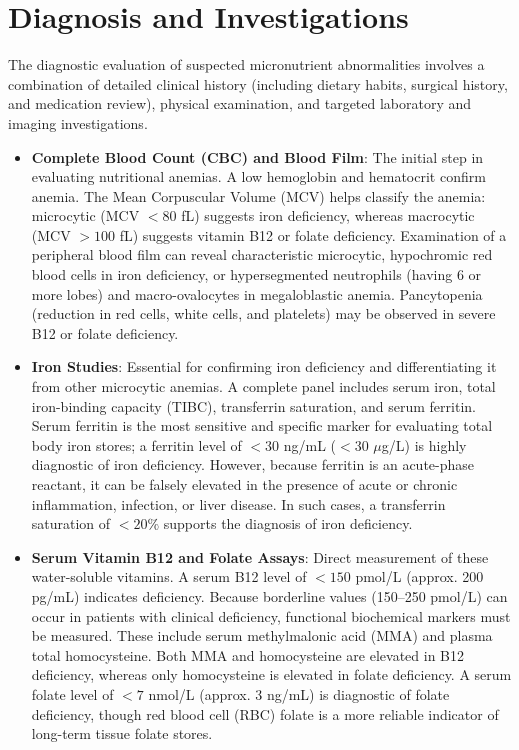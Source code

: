 \section*{Diagnosis and Investigations}
The diagnostic evaluation of suspected micronutrient abnormalities involves a combination of detailed clinical history (including dietary habits, surgical history, and medication review), physical examination, and targeted laboratory and imaging investigations.
\begin{itemize}
\item \textbf{Complete Blood Count (CBC) and Blood Film}: The initial step in evaluating nutritional anemias. A low hemoglobin and hematocrit confirm anemia. The Mean Corpuscular Volume (MCV) helps classify the anemia: microcytic (MCV $< 80$ fL) suggests iron deficiency, whereas macrocytic (MCV $> 100$ fL) suggests vitamin B12 or folate deficiency. Examination of a peripheral blood film can reveal characteristic microcytic, hypochromic red blood cells in iron deficiency, or hypersegmented neutrophils (having 6 or more lobes) and macro-ovalocytes in megaloblastic anemia. Pancytopenia (reduction in red cells, white cells, and platelets) may be observed in severe B12 or folate deficiency.
\item \textbf{Iron Studies}: Essential for confirming iron deficiency and differentiating it from other microcytic anemias. A complete panel includes serum iron, total iron-binding capacity (TIBC), transferrin saturation, and serum ferritin. Serum ferritin is the most sensitive and specific marker for evaluating total body iron stores; a ferritin level of $< 30$ ng/mL ($< 30$ $\mu$g/L) is highly diagnostic of iron deficiency. However, because ferritin is an acute-phase reactant, it can be falsely elevated in the presence of acute or chronic inflammation, infection, or liver disease. In such cases, a transferrin saturation of $< 20\%$ supports the diagnosis of iron deficiency.
\item \textbf{Serum Vitamin B12 and Folate Assays}: Direct measurement of these water-soluble vitamins. A serum B12 level of $< 150$ pmol/L (approx. 200 pg/mL) indicates deficiency. Because borderline values (150--250 pmol/L) can occur in patients with clinical deficiency, functional biochemical markers must be measured. These include serum methylmalonic acid (MMA) and plasma total homocysteine. Both MMA and homocysteine are elevated in B12 deficiency, whereas only homocysteine is elevated in folate deficiency. A serum folate level of $< 7$ nmol/L (approx. 3 ng/mL) is diagnostic of folate deficiency, though red blood cell (RBC) folate is a more reliable indicator of long-term tissue folate stores.

\end{itemize}
